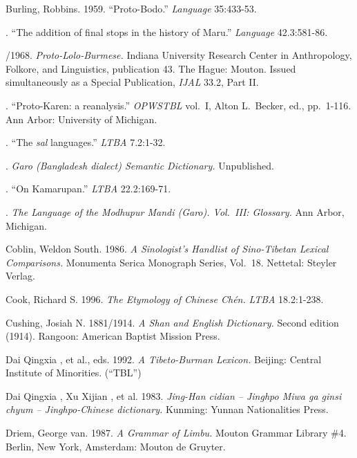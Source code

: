 Burling, Robbins.
1959.
“Proto-Bodo.”
\textit{Language} 35:433-53.

.
“The addition of final stops in the history of Maru.”
\textit{Language} \mbox{42.3:581-86}.

/1968.
\textit{Proto-Lolo-Burmese.}
Indiana University Research Center in Anthropology, Folkore, and Linguistics, publication 43.  The Hague: Mouton. Issued simultaneously as a Special Publication, \textit{IJAL} 33.2, Part II.

.
“Proto-Karen:  a reanalysis.”
\textit{OPWSTBL} vol.\ I, Alton L.\ Becker, ed., pp.\ 1-116.  Ann Arbor: University of Michigan.

.
“The \textit{sal} languages.”
\textit{LTBA} 7.2:1-32.

.
\textit{Garo (Bangladesh dialect) Semantic Dictionary.}
Unpublished.

.
“On Kamarupan.”
\textit{LTBA} 22.2:169-71.

.
\textit{The Language of the Modhupur Mandi (Garo). Vol.~III: Glossary.}
Ann Arbor, Michigan.

Coblin, Weldon South.
1986.
\textit{A Sinologist’s Handlist of Sino-Tibetan Lexical Comparisons.}
Monumenta Serica Monograph Series, Vol.\ 18.  Nettetal: Steyler Verlag.

Cook, Richard S.
1996.
\textit{The Etymology of Chinese  \textnormal{Chén}.}
\textit{LTBA} 18.2:1-238.

Cushing, Josiah N.
1881/1914.
\textit{A Shan and English Dictionary.}
Second edition (1914). Rangoon: American Baptist Mission Press.

Dai Qingxia , et al., eds.
1992.
 \textit{A Tibeto-Burman Lexicon.}
Beijing: Central Institute of Minorities. (“TBL”)

Dai Qingxia , Xu Xijian  , et al.
1983.
 \textit{Jing-Han cidian – Jinghpo Miwa ga ginsi chyum – Jinghpo-Chinese dictionary.}
Kunming: Yunnan Nationalities Press.

Driem, George van.
1987.
\textit{A Grammar of Limbu.}
Mouton Grammar Library \#4.  Berlin, New York, Amsterdam: Mouton de Gruyter.

